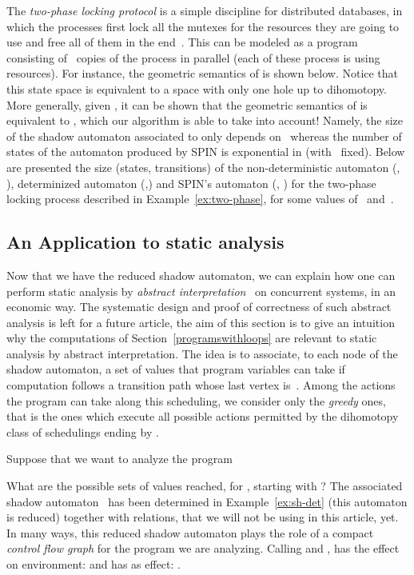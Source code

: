 \documentclass[orivec]{llncs} \usepackage[T1]{fontenc}
\begin{document}
\begin{example}
  \label{ex:two-phase}
  The \emph{two-phase locking protocol} is a simple discipline for distributed
  databases, in which the processes first lock all the mutexes for the resources
  they are going to use and free all of them in the
  end~\cite{gunawardena1994homotopy}. This can be modeled as a program 
  consisting of ~copies of the process 
   in parallel (each of these process is using 
  resources). For instance, the geometric semantics of  is shown
  below. Notice that this state space is equivalent to a space with only one
  hole up to dihomotopy. More generally, given , it can be shown that
  the geometric semantics of  is equivalent to , which our
  algorithm is able to take into account! Namely, the size of the shadow
  automaton associated to  only depends on~ whereas the number of
  states of the automaton produced by SPIN is exponential in  (with~
  fixed). Below are presented the size (states, transitions) of the
  non-deterministic automaton (, ), determinized automaton (,) and
  SPIN's automaton (, ) for the two-phase
  locking process described in Example~\ref{ex:two-phase}, for some values
  of~ and~.
  
\end{example}



\subsection{An Application to static analysis}
\label{sec:static-anal}
Now that we have the reduced shadow automaton, we can 
explain how one can perform static analysis by \emph{abstract
  interpretation}~\cite{systematic} on concurrent systems, in an economic
way. The systematic design and proof of correctness of such abstract analysis is
left for a future article, the aim of this section is to give an intuition why
the computations of Section~\ref{programswithloops} are relevant to static
analysis by abstract interpretation. The idea is to associate, to each node 
of the shadow automaton, a set of values  that program
variables can take if computation follows a transition path
whose last vertex is~. Among the actions the program can take along this
scheduling, we consider only the \emph{greedy} ones, that is the ones which
execute all possible actions permitted by the dihomotopy class of schedulings
ending by .

Suppose that we want to analyze the program

What are the possible sets of values reached, for , starting with ? The associated shadow automaton~ has been determined in
Example~\ref{ex:sh-det} (this automaton is reduced) together with relations,
that we will not be using in this article, yet. In many ways, this reduced
shadow automaton plays the role of a compact \emph{control flow graph} for
the program we are analyzing.
Calling 
 and
,  has the effect on environment:  and
 has as effect: .
\end{document}
